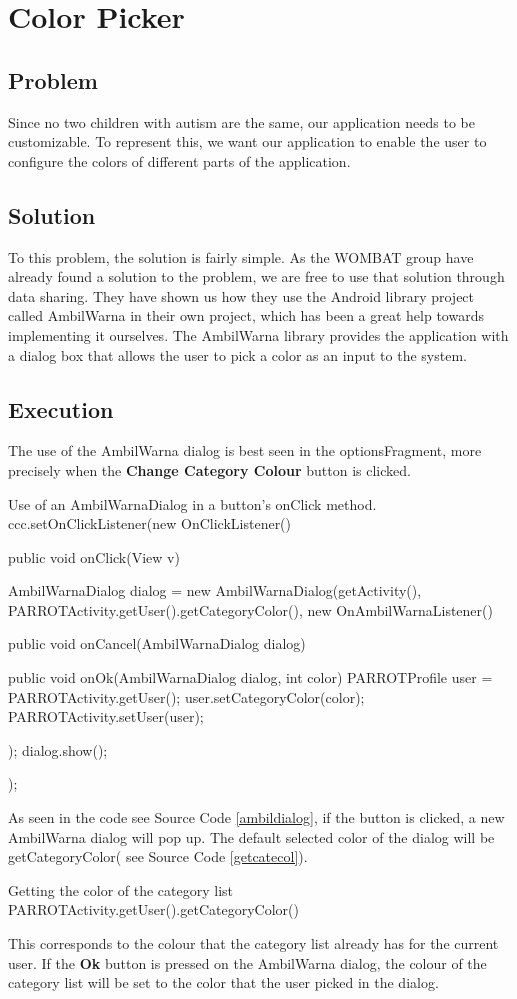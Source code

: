 \section{Color Picker}%
\label{colpic}
\subsection*{Problem}
Since no two children with autism are the same, our application needs to be customizable. To represent this, we want our application to enable the user to configure the colors of different parts of the application.

\subsection*{Solution}
To this problem, the solution is fairly simple. As the WOMBAT group have already found a solution to the problem, we are free to use that solution through data sharing. %
They have shown us how they use the Android library project called AmbilWarna in their own project, which has been a great help towards implementing it ourselves. The AmbilWarna library provides the application with a dialog box that allows the user to pick a color as an input to the system.

\subsection*{Execution}{}
The use of the AmbilWarna dialog is best seen in the optionsFragment, more precisely when the \textbf{Change Category Colour} button is clicked.

\begin{source}[{ambildialog}]{Use of an AmbilWarnaDialog in a button's onClick method.}
		ccc.setOnClickListener(new OnClickListener() {
			public void onClick(View v) {
				AmbilWarnaDialog dialog = new AmbilWarnaDialog(getActivity(),
						PARROTActivity.getUser().getCategoryColor(), new OnAmbilWarnaListener() {
					public void onCancel(AmbilWarnaDialog dialog) {
					}

					public void onOk(AmbilWarnaDialog dialog, int color) {
						PARROTProfile user = PARROTActivity.getUser();
						user.setCategoryColor(color);
						PARROTActivity.setUser(user);
					}
				});
				dialog.show();
			}
		});
\end{source}

As seen in the code see Source Code \ref{ambildialog}, if the button is clicked, a new AmbilWarna dialog will pop up. The default selected color of the dialog will be getCategoryColor( see Source Code \ref{getcatecol}). 
\begin{source}[{getcatecol}]{Getting the color of the category list}
PARROTActivity.getUser().getCategoryColor()
\end{source}
This corresponds to the colour that the category list already has for the current user.\newline
If the \textbf{Ok} button is pressed on the AmbilWarna dialog, the colour of the category list will be set to the color that the user picked in the dialog.

